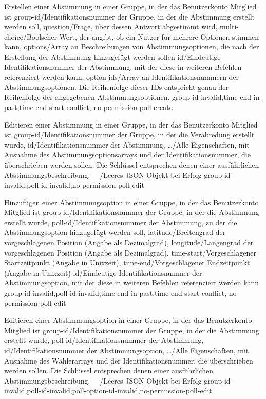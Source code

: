 \documentclass[parskip=full,11pt]{scrartcl}
\begin{document}
{Erstellen einer Abstimmung in einer Gruppe, in der das Benutzerkonto Mitglied
ist}
{group-id/Identifikationsnummer der Gruppe{,} in der die Abstimmung erstellt
werden soll,
question/Frage{,} über dessen Antwort abgestimmt wird,
multi-choice/Boolscher Wert{,} der angibt{,} ob ein Nutzer für mehrere
Optionen stimmen kann,
options/Array an Beschreibungen von Abstimmungsoptionen{,} die nach der
Erstellung der Abstimmung hinzugefügt werden sollen}
{id/Eindeutige Identifikationsnummer der Abstimmung{,} mit der diese in
weiteren Befehlen referenziert werden kann,
option-ids/Array an Identifikationsnummern der Abstimmungsoptionen. Die
Reihenfolge dieser IDs entspricht genau der Reihenfolge der angegebenen
Abstimmungsoptionen.}
{group-id-invalid,time-end-in-past,time-end-start-conflict,
no-permission-poll-create}

{Editieren einer Abstimmung in einer Gruppe, in der das Benutzerkonto Mitglied
ist}
{group-id/Identifikationsnummer der Gruppe{,} in der die Verabredung erstellt
wurde,
id/Identifikationsnummer der Abstimmung,
\dots/Alle Eigenschaften{,} mit Ausnahme des Abstimmungsoptionsarrays und der
Identifikationsnummer{,} die überschrieben werden sollen.
Die Schlüssel entsprechen denen einer ausführlichen Abstimmungsbeschreibung.}
{---/Leeres JSON-Objekt bei Erfolg}
{group-id-invalid,poll-id-invalid,no-permission-poll-edit}

{Hinzufügen einer Abstimmungsoption in einer Gruppe, in der das Benutzerkonto
Mitglied ist}
{group-id/Identifikationsnummer der Gruppe{,} in der die Abstimmung erstellt
wurde,
poll-id/Identifikationsnummer der Abstimmung{,} zu der die Abstimmungsoption
hinzugefügt werden soll,
latitude/Breitengrad der vorgeschlagenen Position (Angabe als Dezimalgrad),
longitude/Längengrad der vorgeschlagenen Position (Angabe als Dezimalgrad),
time-start/Vorgeschlagener Startzeitpunkt (Angabe in Unixzeit),
time-end/Vorgeschlagener Endzeitpunkt (Angabe in Unixzeit)}
{id/Eindeutige Identifikationsnummer der Abstimmungsoption{,} mit der diese in
weiteren Befehlen referenziert werden kann}
{group-id-invalid,poll-id-invalid,time-end-in-past,time-end-start-conflict,
no-permission-poll-edit}

{Editieren einer Abstimmungsoption in einer Gruppe, in der das Benutzerkonto
Mitglied ist}
{group-id/Identifikationsnummer der Gruppe{,} in der die Abstimmung erstellt
wurde,
poll-id/Identifikationsnummer der Abstimmung,
id/Identifikationsnummer der Abstimmungsoption,
\dots/Alle Eigenschaften{,} mit Ausnahme des Wählerarrays und der
Identifikationsnummer{,} die überschrieben werden sollen.
Die Schlüssel entsprechen denen einer ausführlichen Abstimmungsbeschreibung.}
{---/Leeres JSON-Objekt bei Erfolg}
{group-id-invalid,poll-id-invalid,poll-option-id-invalid,no-permission-poll-edit}
\end{document}
